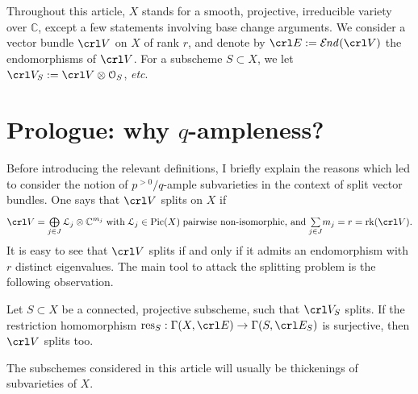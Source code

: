 \documentclass[11pt,reqno]{amsart}
\let\euf\EuScript
\let\mbb\mathbb
\let\nit\noindent
\numberwithin{equation}{section}
\numberwithin{figure}{section}
\begin{document}
Throughout this article, $X$ stands for a smooth, projective, irreducible variety 
over ${{\mbb C}}$, except a few statements involving base change arguments. 
We consider a vector bundle $\crl V$ on $X$ of rank $r$, and denote by 
$\crl E:={\operatorname{\mathcal{E}\kern-1pt\textit{nd}\kern1pt}}(\crl V)$ the endomorphisms of $\crl V$. 
For a subscheme $S\subset X$, we let $\crl V_S:=\crl V\otimes{{\euf O}}_S$, \textit{etc}. 

\setcounter{tocdepth}{1}\tableofcontents

\setcounter{section}{-1}

\section{Prologue: why $q$-ampleness?}\label{sct:why}

Before introducing the relevant definitions, I briefly explain the reasons which led 
to  consider the notion of $p^{{>0}}/q$-ample subvarieties in the context of 
split vector bundles. One says that $\crl V$ splits on $X$ if 
$$
\crl V =\mbox{${{\overset{{}}{\underset{{j\in J}}{\bigoplus}}}}$}\,{{\euf L}}_j\otimes{{\mbb C}}^{m_j}
\;\text{with}\;{{\euf L}}_j\in{\mathop{\rm Pic}\nolimits}(X)\;\text{pairwise non-isomorphic, and}\;
\mbox{${{\overset{{}}{\underset{{j\in J}}{\sum}}}}$}m_j=r={{\rm rk}}(\crl V).
$$ 
It is easy to see that $\crl V$ splits if and only if it admits an endomorphism with $r$ 
distinct eigenvalues. The main tool to attack the splitting problem is the following 
observation. 

\begin{m-lemma}\label{lm:idea}
Let $S\subset X$ be a connected, projective subscheme, such that $\crl V_S$ splits. 
If the restriction homomorphism ${{\rm res}}_S:\Gamma(X,\crl E)\to\Gamma(S,\crl E_S)$ 
is surjective, then $\crl V$ splits too. 
\end{m-lemma}
\nit The subschemes considered in this article will usually be thickenings 
of subvarieties of $X$.
\end{document}
